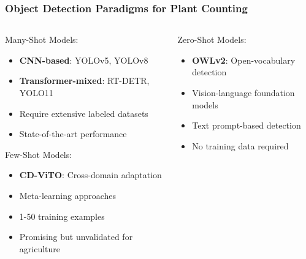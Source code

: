 \documentclass[aspectratio=43]{beamer}
\begin{document}
\begin{frame}
    \frametitle{Object Detection Paradigms for Plant Counting}
    
    \begin{columns}
        \begin{column}{0.5\textwidth}
            \begin{block}{Many-Shot Models:}
                \small
                \begin{itemize}
                    \item \textbf{CNN-based}: YOLOv5, YOLOv8
                    \item \textbf{Transformer-mixed}: RT-DETR, YOLO11
                    \item Require extensive labeled datasets
                    \item State-of-the-art performance
                \end{itemize}
            \end{block}
            
            \begin{block}{Few-Shot Models:}
                \small
                \begin{itemize}
                    \item \textbf{CD-ViTO}: Cross-domain adaptation
                    \item Meta-learning approaches
                    \item 1-50 training examples
                    \item Promising but unvalidated for agriculture
                \end{itemize}
            \end{block}
        \end{column}
        
        \begin{column}{0.5\textwidth}
            \begin{block}{Zero-Shot Models:}
                \small
                \begin{itemize}
                    \item \textbf{OWLv2}: Open-vocabulary detection
                    \item Vision-language foundation models
                    \item Text prompt-based detection
                    \item No training data required
                \end{itemize}
            \end{block}
            

\end{column}
\end{columns}
\end{frame}
\end{document}

